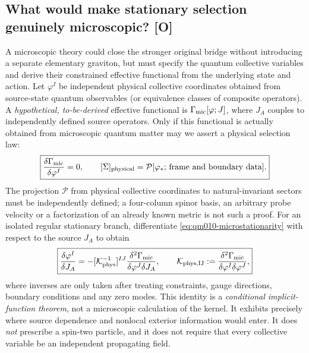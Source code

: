 \documentclass[11pt,a4paper]{article}
\begin{document}
\subsection{What would make stationary selection genuinely microscopic? [O]}\label{sec:qm010-micro}
A microscopic theory could close the stronger original bridge without introducing a separate elementary graviton, but must specify the quantum collective variables and derive their constrained effective functional from the underlying state and action. Let $\varphi^I$ be independent physical collective coordinates obtained from source-state quantum observables (or equivalence classes of composite operators). A \emph{hypothetical, to-be-derived} effective functional is $\Gamma_{\rm mic}[\varphi;J]$, where $J_A$ couples to independently defined source operators. Only if this functional is actually obtained from microscopic quantum matter may we assert a physical selection law:
\begin{equation}\label{eq:qm010-microstationarity}
\boxed{\frac{\delta\Gamma_{\rm mic}}{\delta\varphi^I}=0,
\qquad [\Sigma]_{\rm physical}=\mathcal P[\varphi_*;\,\text{frame and boundary data}].}\end{equation}
The projection $\mathcal P$ from physical collective coordinates to natural-invariant sectors must be independently defined; a four-column spinor basis, an arbitrary probe velocity or a factorization of an already known metric is not such a proof. For an isolated regular stationary branch, differentiate \eqref{eq:qm010-microstationarity} with respect to the source $J_A$ to obtain
\begin{equation}\label{eq:qm010-hessian-response}
\boxed{\frac{\delta\varphi^I}{\delta J_A}
=-[\mathcal K_{\rm phys}^{-1}]^{IJ}
\frac{\delta^2\Gamma_{\rm mic}}{\delta\varphi^J\delta J_A},\qquad
\mathcal K_{\rm phys, IJ}:=\frac{\delta^2\Gamma_{\rm mic}}{\delta\varphi^I\delta\varphi^J},}
\end{equation}
where inverses are only taken after treating constraints, gauge directions, boundary conditions and any zero modes. This identity is a \emph{conditional implicit-function theorem}, not a microscopic calculation of the kernel. It exhibits precisely where source dependence and nonlocal exterior information would enter. It does \emph{not} prescribe a spin-two particle, and it does not require that every collective variable be an independent propagating field.
\end{document}
